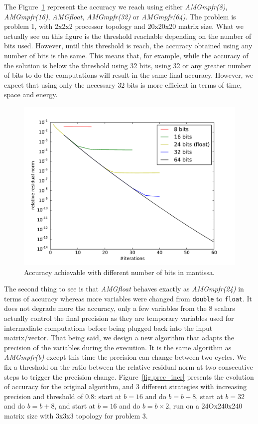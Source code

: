 \documentclass[sigplan]{acmart}
\begin{document}
   The Figure~\ref{fig.bits_accuracy} represent the accuracy we reach using either \emph{AMGmpfr(8)}, \emph{AMGmpfr(16)}, \emph{AMGfloat}, \emph{AMGmpfr(32)} or \emph{AMGmpfr(64)}. The problem is problem 1, with 2x2x2 processor topology and 20x20x20 matrix size.
   What we actually see on this figure is the threshold reachable depending on the number of bits used. However, until this threshold is reach, the accuracy obtained using any number of bits is the same. This means that, for example,
   while the accuracy of the solution is below the threshold using 32 bits, using 32 or any greater number of bits to do the computations will result in the same final accuracy. However, we expect that using only the necessary $32$ bits is 
   more efficient in terms of time, space and energy.
   
   \begin{figure} \centering
    \includegraphics[width=0.8\linewidth]{figs/bits_convergence.pdf}
    \caption{Accuracy achievable with different number of bits in mantissa.}
    \label{fig.bits_accuracy}
   \end{figure}
   
   The second thing to see is that \emph{AMGfloat} behaves exactly as \emph{AMGmpfr(24)} in terms of accuracy whereas more variables were changed from \texttt{double} to \texttt{float}. It does not degrade more the accuracy, only a few variables
   from the 8 scalars actually control the final precision as they are temporary variables used for intermediate computations before being plugged back into the input matrix/vector.
   That being said, we design a new algorithm that adapts the precision of the variables during the execution. It is the same algorithm as \emph{AMGmpfr(b)} except this time the precision can change between two cycles.
   We fix a threshold on the ratio between the relative residual norm at two consecutive steps to trigger the precision change.
   Figure~\ref{fig.prec_incr} presents the evolution of accuracy for the original algorithm, and 3 different strategies with increasing precision and threshold of 0.8: start at $b=16$ and do $b=b+8$, start at $b=32$
   and do $b=b+8$, and start at $b=16$ and do $b=b\times2$, run on a 24Ox240x240 matrix size with 3x3x3 topology for problem 3.
   
\end{document}
